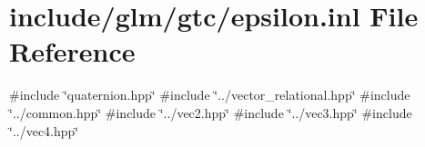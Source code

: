 \hypertarget{epsilon_8inl}{}\section{include/glm/gtc/epsilon.inl File Reference}
\label{epsilon_8inl}
{\ttfamily \#include \char`\"{}quaternion.\+hpp\char`\"{}}\newline
{\ttfamily \#include \char`\"{}../vector\+\_\+relational.\+hpp\char`\"{}}\newline
{\ttfamily \#include \char`\"{}../common.\+hpp\char`\"{}}\newline
{\ttfamily \#include \char`\"{}../vec2.\+hpp\char`\"{}}\newline
{\ttfamily \#include \char`\"{}../vec3.\+hpp\char`\"{}}\newline
{\ttfamily \#include \char`\"{}../vec4.\+hpp\char`\"{}}\newline
